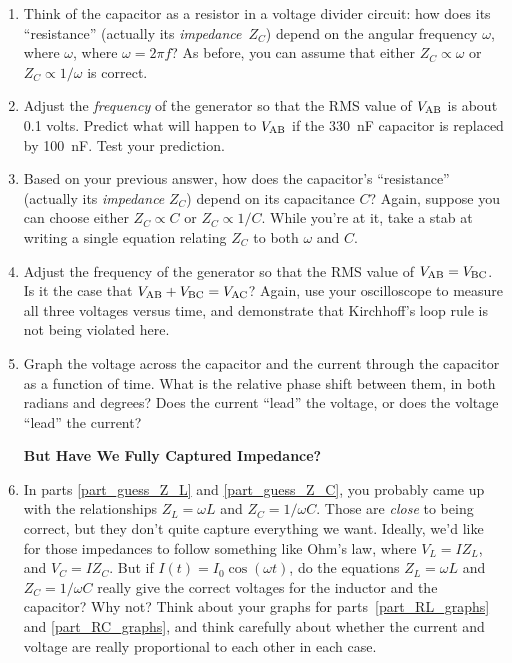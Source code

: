 \begin{enumerate}[wide]
\item Think of the capacitor as a resistor in a voltage divider circuit: how does its ``resistance'' (actually its \textit{impedance}~$Z_C$) depend on the angular frequency $\omega$, where $\omega$, where $\omega = 2 \pi f$?  As before, you can assume that either $Z_C \propto \omega$ or $Z_C \propto 1 / \omega$ is correct.

\item Adjust the \textit{frequency} of the generator so that the RMS value of $V_{\rm AB}$ is about 0.1 volts.  Predict what will happen to $V_{\rm AB}$ if the 330~nF capacitor is replaced by 100~nF.  Test your prediction.  

\item Based on your previous answer, how does the capacitor's ``resistance'' (actually its \textit{impedance} $Z_C$) depend on its capacitance $C$?  Again, suppose you can choose either $Z_C \propto C$ or $Z_C \propto 1 / C$.  While you're at it, take a stab at writing a single equation relating $Z_C$ to both $\omega$ and $C$.
\label{part_guess_Z_C}

\item Adjust the frequency of the generator so that the RMS value of $V_{\rm AB} = V_{\rm BC}$.   Is it the case that $V_{\rm AB} + V_{\rm BC} = V_{\rm AC}$?  Again, use your oscilloscope to measure all three voltages versus time, and demonstrate that Kirchhoff's loop rule is not being violated here.  

\item Graph the voltage across the capacitor and the current through the capacitor as a function of time.  What is the relative phase shift between them, in both radians and degrees?  Does the current ``lead'' the voltage, or does the voltage ``lead'' the current? \label{part_RC_graphs}

\bigskip\bigskip\bigskip

\textbf{But Have We Fully Captured Impedance?}

\item In parts \ref{part_guess_Z_L} and \ref{part_guess_Z_C}, you probably came up with the relationships $Z_L = \omega L$ and $Z_C = 1/ \omega C$.  Those are \textit{close} to being correct, but they don't quite capture everything we want.  Ideally, we'd like for those impedances to follow something like Ohm's law, where $V_L = I Z_L$, and $V_C = I Z_C$.  But if  $I(t) = I_0 \cos(\omega t)$, do the equations $Z_L = \omega L$ and $Z_C = 1/ \omega C$ really give the correct voltages for the inductor and the capacitor?  Why not?  Think about your graphs for parts~\ref{part_RL_graphs} and \ref{part_RC_graphs}, and think carefully about whether the current and voltage are really proportional to each other in each case.

\end{enumerate}





